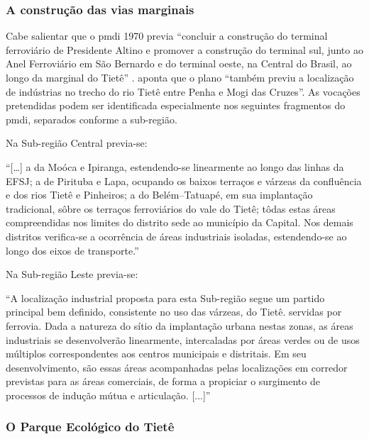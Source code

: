 \documentclass[
article,			%
11pt,				%
oneside,			%
a4paper,			%
english,			%
brazil,				%
sumario=tradicional
]{abntex2}
\begin{document}
	\subsubsection{A construção das vias marginais} \label{s3:marginaltiete}
	
	Cabe salientar que o \gls{pmdi} 1970 previa ``concluir a construção do terminal ferroviário de Presidente Altino e promover a construção do terminal sul, junto ao Anel Ferroviário em São Bernardo e do terminal oeste, na Central do Brasil, ao longo da marginal do Tietê'' \cite[p. XVIII]{gegran1970a}.  aponta que o plano ``também previu a localização de indústrias no trecho do rio Tietê entre Penha e Mogi das Cruzes''. As vocações pretendidas podem ser identificada especialmente nos seguintes fragmentos do \gls{pmdi}, separados conforme a sub-região.
	
	Na Sub-região Central previa-se:
	
	\begin{citacao}
		``[\dots] a da Moóca e Ipiranga, estendendo-se linearmente ao longo das linhas da EFSJ; a de Pirituba e Lapa, ocupando os baixos terraços e várzeas da confluência e dos rios Tietê e Pinheiros; a do Belém--Tatuapé, em sua implantação tradicional, sôbre os terraços ferroviários do vale do Tietê; tôdas estas áreas compreendidas nos limites do distrito sede ao município da Capital. Nos demais distritos verifica-se a ocorrência de áreas industriais isoladas, estendendo-se ao longo dos eixos de transporte.'' \cite[p. 9]{gegran1970a}
	\end{citacao}
	
	Na Sub-região Leste previa-se:
	
	\begin{citacao}
		``A localização industrial proposta para esta Sub-região segue um partido principal bem definido, consistente no uso das várzeas, do Tietê. servidas por ferrovia. Dada a natureza do sítio da implantação urbana nestas zonas, as áreas industriais
		se desenvolverão linearmente, intercaladas por áreas verdes ou de usos múltiplos correspondentes aos centros municipais e distritais. Em seu desenvolvimento, são essas áreas acompanhadas pelas localizações em corredor previstas para as áreas comerciais, de forma a propiciar o surgimento de processos de indução mútua e articulação. [...]'' \cite[p. 9]{gegran1970a}
	\end{citacao}
		
	\subsubsection{O Parque Ecológico do Tietê} \label{s3:pet}
	
\end{document}

